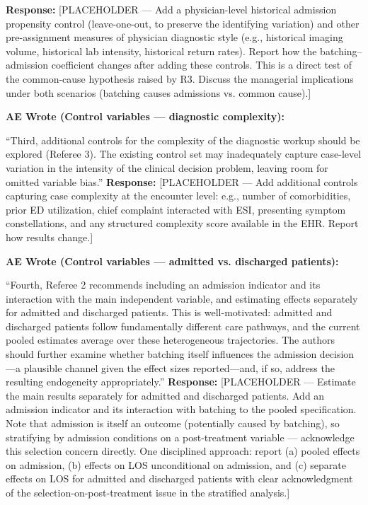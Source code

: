 \documentclass[11pt]{article}
\newenvironment{quote2}
{ \bigskip
\noindent
         \small\em
         \baselineskip=14pt
}
\newcommand{\1}{\hbox{\rm 1\kern-.35em 1}}
\begin{document}
\noindent\textbf{Response:} \color{blue}[PLACEHOLDER --- Add a physician-level historical admission propensity control (leave-one-out, to preserve the identifying variation) and other pre-assignment measures of physician diagnostic style (e.g., historical imaging volume, historical lab intensity, historical return rates). Report how the batching--admission coefficient changes after adding these controls. This is a direct test of the common-cause hypothesis raised by R3. Discuss the managerial implications under both scenarios (batching causes admissions vs. common cause).]
\color{black}

\begin{quote2}
\textbf{AE Wrote (Control variables --- diagnostic complexity):}

\noindent ``Third, additional controls for the complexity of the diagnostic workup should be explored (Referee 3). The existing control set may inadequately capture case-level variation in the intensity of the clinical decision problem, leaving room for omitted variable bias.''
\end{quote2}

\noindent\textbf{Response:} \color{blue}[PLACEHOLDER --- Add additional controls capturing case complexity at the encounter level: e.g., number of comorbidities, prior ED utilization, chief complaint interacted with ESI, presenting symptom constellations, and any structured complexity score available in the EHR. Report how results change.]
\color{black}

\begin{quote2}
\textbf{AE Wrote (Control variables --- admitted vs. discharged patients):}

\noindent ``Fourth, Referee 2 recommends including an admission indicator and its interaction with the main independent variable, and estimating effects separately for admitted and discharged patients. This is well-motivated: admitted and discharged patients follow fundamentally different care pathways, and the current pooled estimates average over these heterogeneous trajectories. The authors should further examine whether batching itself influences the admission decision---a plausible channel given the effect sizes reported---and, if so, address the resulting endogeneity appropriately.''
\end{quote2}

\noindent\textbf{Response:} \color{blue}[PLACEHOLDER --- Estimate the main results separately for admitted and discharged patients. Add an admission indicator and its interaction with batching to the pooled specification. Note that admission is itself an outcome (potentially caused by batching), so stratifying by admission conditions on a post-treatment variable --- acknowledge this selection concern directly. One disciplined approach: report (a) pooled effects on admission, (b) effects on LOS unconditional on admission, and (c) separate effects on LOS for admitted and discharged patients with clear acknowledgment of the selection-on-post-treatment issue in the stratified analysis.]
\color{black}
\end{document}

